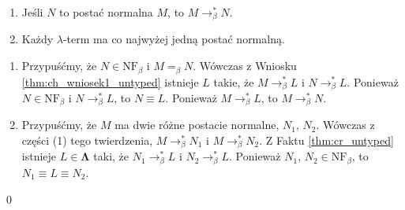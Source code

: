 \begin{wniosek}\label{thm:ch_wniosek2_untyped}
  \begin{enumerate}[label={(\arabic*)}, ref={(\arabic*)}]
  \setlength\itemsep{0em}
  \item Jeśli \(N\) to postać normalna \(M\), to \(M\to^{*}_\beta N\).
  \item Każdy \(\lambda\)-term ma co najwyżej jedną postać normalną.
  \end{enumerate}
\end{wniosek}
\begin{dowod}
  \begin{enumerate}[label={(\arabic*)}, ref={(\arabic*)}]
  \setlength\itemsep{0em}
  \item Przypuśćmy, że \(N\in \mathrm{NF}_\beta\) i \(M=_\beta N\). Wówczas z Wniosku \ref{thm:ch_wniosek1_untyped} istnieje \(L\) takie, że \(M\to^{*}_\beta L\) i \(N\to^{*}_\beta L\). Ponieważ \(N\in \mathrm{NF}_\beta\) i \(N\to^{*}_\beta L\), to \(N\equiv L\). Ponieważ \(M\to^{*}_\beta L\), to \(M\to^{*}_\beta N\).
  \item Przypuśćmy, że \(M\) ma dwie różne postacie normalne, \(N_1,\, N_2\). Wówczas z części (1) tego twierdzenia, \(M\to^{*}_\beta N_1\) i \(M\to^{*}_\beta N_2\). Z Faktu \ref{thm:cr_untyped} istnieje \(L\in\mathbf{\Lambda}\) taki, że \(N_1 \to^{*}_\beta L\) i \(N_2 \to^{*}_\beta L\). Ponieważ \(N_1,\,N_2\in \mathrm{NF}_\beta\), to \(N_1\equiv L \equiv N_2\).
  \end{enumerate}
  \qed
\end{dowod}
